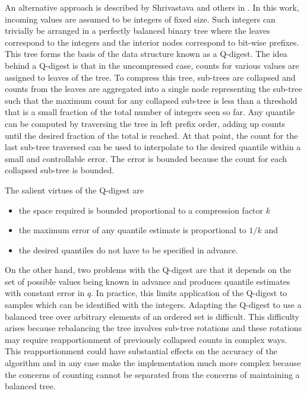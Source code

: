 \documentclass[]{statsoc}
\begin{document}
An alternative approach is described by Shrivastava and others in \cite{qdigest}.  In this work, incoming values are assumed to be integers of fixed size. Such integers can trivially be arranged in a perfectly balanced binary tree where the leaves correspond to the integers and the interior nodes correspond to bit-wise prefixes. This tree forms the basis of the data structure known as a Q-digest.  The idea behind a Q-digest is that in the uncompressed case, counts for various values are assigned to leaves of the tree.  To compress this tree, sub-trees are collapsed and counts from the leaves are aggregated into a single node representing the sub-tree such that the maximum count for any collapsed sub-tree is less than a threshold that is a small fraction of the total number of integers seen so far.  Any quantile can be computed by traversing the tree in left prefix order, adding up counts until the desired fraction of the total is reached.  At that point, the count for the last sub-tree traversed can be used to interpolate to the desired quantile within a small and controllable error.  The error is bounded because the count for each collapsed sub-tree is bounded.

The salient virtues of the Q-digest are
\begin{itemize}[nosep, topsep=-10pt]
\item the space required is bounded proportional to a compression factor $k$
\item the maximum error of any quantile estimate is proportional to $1/k$ and
\item the desired quantiles do not have to be specified in advance.
\vspace{10pt}
\end{itemize}

On the other hand, two problems with the Q-digest are that it depends on the set of possible values being known in advance and produces quantile estimates with constant error in $q$. In practice, this limits application of the Q-digest to samples which can be identified with the integers. Adapting the Q-digest to use a balanced tree over arbitrary elements of an ordered set is difficult.  This difficulty arises because rebalancing the tree involves sub-tree rotations and these rotations may require reapportionment of previously collapsed counts in complex ways.  This reapportionment could have substantial effects on the accuracy of the algorithm and in any case make the implementation much more complex because the concerns of counting cannot be separated from the concerns of maintaining a balanced tree.  
\end{document}
